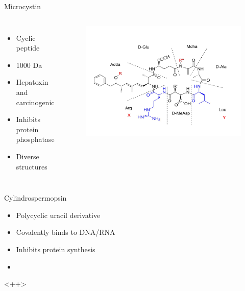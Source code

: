 \begin{frame}{Microcystin}

\begin{columns}

	\begin{itemize}
		\item Cyclic peptide
		\item 1000 Da
		\item Hepatoxin and carcinogenic
		\item Inhibits protein phosphatase
		\item Diverse structures

	\end{itemize}

\begin{figure}
	\centering
	\hspace*{-3cm}
	\includegraphics[scale=0.2]{../figures/Microcystin-LR.png}
\end{figure}
\end{columns}

\end{frame}
\begin{frame}{Cylindrospermopsin}
	\begin{itemize}
		\item Polycyclic uracil derivative 
		\item Covalently binds to DNA/RNA 
		\item Inhibits protein synthesis 
		\item  
	\end{itemize}

	<++>
\end{frame}

